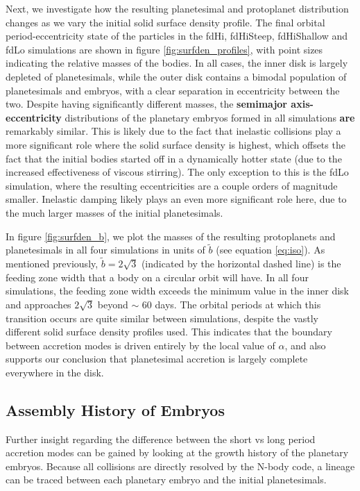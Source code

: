 \documentclass[twocolumn,linenumbers]{aastex63}
\begin{document}
Next, we investigate how the resulting planetesimal and protoplanet distribution
changes as we vary the initial solid surface density profile.
The final orbital period-eccentricity state of the
particles in the fdHi, fdHiSteep, fdHiShallow and fdLo simulations are shown in figure \ref{fig:surfden_profiles}, with point sizes 
indicating the relative masses of the bodies. In all cases, the inner disk is largely depleted of planetesimals, while the outer disk 
contains a bimodal population of planetesimals and embryos, with a clear separation in eccentricity between the two. Despite 
having significantly different masses, the \textbf{semimajor axis-eccentricity} distributions of the planetary embryos formed in all simulations \textbf{are} remarkably similar. This 
is likely due to the fact that inelastic collisions play a more significant role where the solid surface density is highest, which 
offsets the fact that the initial bodies started off in a dynamically hotter state (due to the increased effectiveness of viscous stirring). The only exception to this is the fdLo simulation, 
where the resulting eccentricities are a couple orders of magnitude smaller. Inelastic damping likely plays an even more 
significant role here, due to the much larger masses of the initial planetesimals.

In figure \ref{fig:surfden_b}, we plot the masses of the resulting protoplanets and planetesimals in all four simulations in units of $
\tilde{b}$ (see equation \ref{eq:iso}). 
As mentioned previously, $\tilde{b} = 2 \sqrt{3}$ (indicated by the horizontal dashed line) is the  
feeding zone width that a body on a circular orbit will have. In all four simulations, the feeding zone width exceeds the 
minimum value in the inner disk and approaches $2 \sqrt{3}$ beyond $\sim$ 60 days. The orbital periods at which this transition 
occurs are quite similar between simulations, despite the vastly different solid surface density profiles used. This indicates that 
the boundary between accretion modes is driven entirely by the local value of $\alpha$, and also supports our 
conclusion that planetesimal accretion is largely complete everywhere in the disk.

\subsection{Assembly History of Embryos}\label{sec:assembly}

Further insight regarding the difference between the short vs long period accretion modes can be gained by looking at the 
growth history of the planetary embryos. Because all collisions are directly resolved by the N-body code, a lineage can be 
traced between each planetary embryo and the initial planetesimals.
\end{document}
